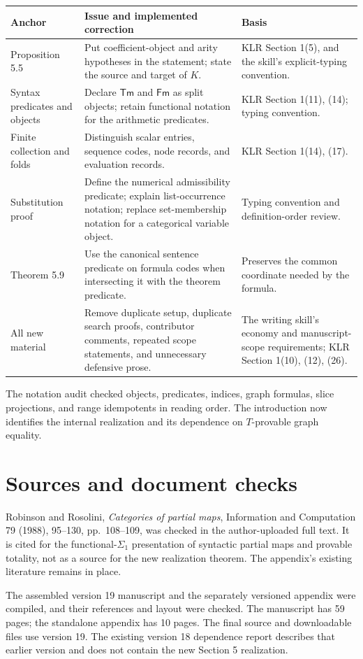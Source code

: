 \documentclass[11pt]{article}
\begin{document}
\begin{longtable}{@{}>{\raggedright\arraybackslash}p{}>{\raggedright\arraybackslash}p{}>{\raggedright\arraybackslash}p{}@{}}
\textbf{Anchor}&\textbf{Issue and implemented correction}&\textbf{Basis}\\\hline
Proposition 5.5&Put coefficient-object and arity hypotheses in the
statement; state the source and target of $K$.&KLR Section 1(5),
and the skill's explicit-typing convention.\\[5pt]
Syntax predicates and objects&Declare $\mathsf{Tm}$ and $\mathsf{Fm}$
as split objects; retain functional notation for the arithmetic
predicates.&KLR Section 1(11), (14); typing convention.\\[5pt]
Finite collection and folds&Distinguish scalar entries, sequence codes,
node records, and evaluation records.&KLR Section 1(14), (17).\\[5pt]
Substitution proof&Define the numerical admissibility predicate;
explain list-occurrence notation; replace set-membership notation
for a categorical variable object.&Typing convention and
definition-order review.\\[5pt]
Theorem 5.9&Use the canonical sentence predicate on formula codes
when intersecting it with the theorem predicate.&Preserves the
common coordinate needed by the formula.\\[5pt]
All new material&Remove duplicate setup, duplicate search proofs,
contributor comments, repeated scope statements, and unnecessary
defensive prose.&The writing skill's economy and manuscript-scope
requirements; KLR Section 1(10), (12), (26).\\
\end{longtable}

The notation audit checked objects, predicates, indices, graph formulas,
slice projections, and range idempotents in reading order. The
introduction now identifies the internal realization and its dependence
on $T$-provable graph equality.

\section*{Sources and document checks}
Robinson and Rosolini, \emph{Categories of partial maps},
Information and Computation 79 (1988), 95--130, pp.~108--109, was
checked in the author-uploaded full text. It is cited for the
functional-$\Sigma_1$ presentation of syntactic partial maps and
provable totality, not as a source for the new realization theorem.
The appendix's existing literature remains in place.

The assembled version 19 manuscript and the separately versioned
appendix were compiled, and their references and layout were checked.
The manuscript has 59 pages; the standalone appendix has 10 pages.
The final source and downloadable files use version 19. The existing
version 18 dependence report describes that earlier version and does
not contain the new Section 5 realization.
\end{document}

